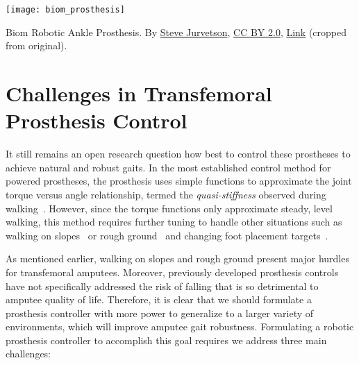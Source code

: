 \begin{marginfigure}[-1in]
    \centering
    \texttt{[image: biom\_prosthesis]}
    \caption{Biom Robotic Ankle Prosthesis. By
    \href{https://www.flickr.com/photos/jurvetson/13480667874/}{Steve
    Jurvetson}, \href{http://creativecommons.org/licenses/by/2.0}{CC BY 2.0},
    \href{https://commons.wikimedia.org/w/index.php?curid=32568854}{Link}
    (cropped from original).}
    \label{fig:biom_ankle}
\end{marginfigure}

\section{Challenges in Transfemoral Prosthesis
Control}\label{sec:intro_challenges} 

It still remains an open research question how best to control these prostheses
to achieve natural and robust gaits. In the most established control method for
powered prostheses, the prosthesis uses simple functions to approximate the
joint torque versus angle relationship, termed the \emph{quasi-stiffness}
observed during walking~\citep{sup2007design, lenzi2014speed}. However, since
the torque functions only approximate steady, level walking, this method
requires further tuning to handle other situations such as walking on
slopes~\citep{sup2011upslope} or rough ground~\citep{thatte2016toward} and
changing foot placement targets~\citep{schepelmann2016evaluation}. 

As mentioned earlier, walking on slopes and rough ground present major hurdles
for transfemoral amputees. Moreover, previously developed prosthesis controls
have not specifically addressed the risk of falling that is so detrimental to
amputee quality of life. Therefore, it is clear that we should formulate a
prosthesis controller with more power to generalize to a larger variety of
environments, which will improve amputee gait robustness. Formulating a robotic
prosthesis controller to accomplish this goal requires we address three main
challenges:

